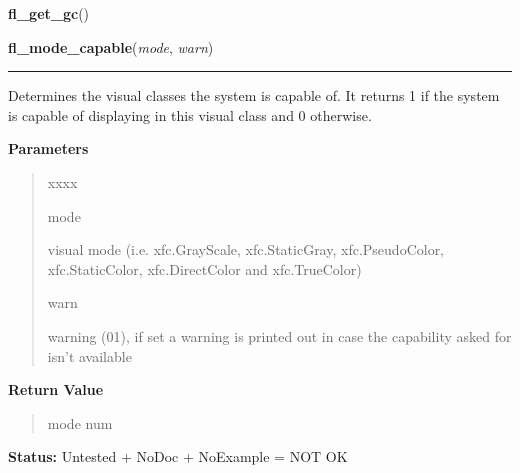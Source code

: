     \label{xformslib:library:fl_get_gc}

    \vspace{0.5ex}

\hspace{.8\funcindent}\begin{boxedminipage}{\funcwidth}

    \raggedright \textbf{fl\_get\_gc}()

\setlength{\parskip}{2ex}
\setlength{\parskip}{1ex}
    \end{boxedminipage}

    \label{xformslib:library:fl_mode_capable}

    \vspace{0.5ex}

\hspace{.8\funcindent}\begin{boxedminipage}{\funcwidth}

    \raggedright \textbf{fl\_mode\_capable}(\textit{mode}, \textit{warn})

    \vspace{-1.5ex}

    \rule{\textwidth}{0.5\fboxrule}
\setlength{\parskip}{2ex}
    Determines the visual classes the system is capable of. It returns 1 if
    the system is capable of displaying in this visual class and 0 
    otherwise.

\setlength{\parskip}{1ex}
      \textbf{Parameters}
      \vspace{-1ex}

      \begin{quote}
        \begin{Ventry}{xxxx}

          \item[mode]

          visual mode (i.e. xfc.GrayScale, xfc.StaticGray, xfc.PseudoColor,
          xfc.StaticColor, xfc.DirectColor and xfc.TrueColor)

          \item[warn]

          warning (0{\textbar}1), if set a warning is printed out in case 
          the capability asked for isn't available

        \end{Ventry}

      \end{quote}

      \textbf{Return Value}
    \vspace{-1ex}

      \begin{quote}
      mode num

      \end{quote}

\textbf{Status:} Untested + NoDoc + NoExample = NOT OK



    \end{boxedminipage}

